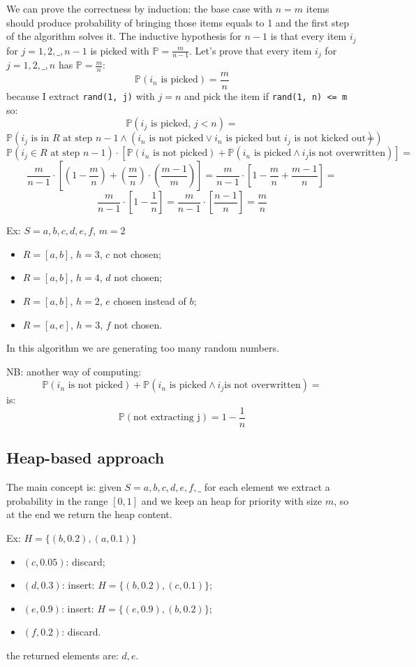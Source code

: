 We can prove the correctness by induction: the base case with $n = m$ items should produce probability of bringing those items equals to 1 and the first step of the algorithm solves it.
The inductive hypothesis for $n-1$ is that every item $i_j$ for $j = 1, 2, \_, n-1$ is picked with $\mathbb{P} = \frac{m}{n-1}$.
Let's prove that every item $i_j$ for $j=1, 2, \_, n$ has $\mathbb{P} = \frac{m}{n}$:
$$
    \mathbb{P}(i_n \text{ is picked}) = \frac{m}{n}
$$
because I extract \verb|rand(1, j)| with $j=n$ and pick the item if \verb|rand(1, n) <= m| so:
$$
    \mathbb{P}(i_j \text{ is picked, } j < n) = 
$$
$$
    \mathbb{P}(i_j \text{ is in } R \text{ at step } n-1 \land (i_n \text{ is not picked} \lor i_n \text{ is picked but } i_j \text{ is not kicked out})) =
$$
$$
    \mathbb{P}(i_j \in R \text{ at step } n-1) \cdot \left[ \mathbb{P}(i_n \text{ is not picked}) + \mathbb{P}(i_n \text{ is picked} \land i_j \text{is not overwritten}) \right]=
$$
$$
    \frac{m}{n-1} \cdot \left[ \left( 1 - \frac{m}{n} \right) + \left( \frac{m}{n} \right) \cdot \left( \frac{m-1}{m} \right) \right] = \frac{m}{n-1} \cdot \left[ 1 - \frac{m}{n} + \frac{m-1}{n} \right] =
$$
$$
    \frac{m}{n-1} \cdot \left[ 1 - \frac{1}{n} \right] = \frac{m}{n-1} \cdot \left[ \frac{n-1}{n} \right] = \frac{m}{n}
$$

Ex: $S = a, b, c, d, e, f$, $m=2$
\begin{itemize}
    \item $R = [a, b]$, $h = 3$, $c$ not chosen;
    \item $R = [a, b]$, $h = 4$, $d$ not chosen;
    \item $R = [a, b]$, $h = 2$, $e$ chosen instead of $b$;
    \item $R = [a, e]$, $h = 3$, $f$ not chosen.
\end{itemize}

In this algorithm we are generating too many random numbers.

NB: another way of computing: 
$$
    \mathbb{P}(i_n \text{ is not picked}) + \mathbb{P}(i_n \text{ is picked} \land i_j \text{is not overwritten}) = 
$$
is:
$$
    \mathbb{P}(\text{not extracting j}) = 1 - \frac{1}{n}
$$

\subsection{Heap-based approach}
The main concept is: given $S=a, b, c, d, e, f, \_$ for each element we extract a probability in the range $[0, 1]$ and we keep an heap for priority with size $m$, so at the end we return the heap content.

Ex: $H = \{ (b, 0.2), (a, 0.1) \}$
\begin{itemize}
    \item $(c, 0.05)$: discard;
    \item $(d, 0.3)$: insert: $H = \{ (b, 0.2), (c, 0.1) \}$;
    \item $(e, 0.9)$: insert: $H = \{ (e, 0.9), (b, 0.2) \}$;
    \item $(f, 0.2)$: discard.
\end{itemize}
the returned elements are: $d, e$.


